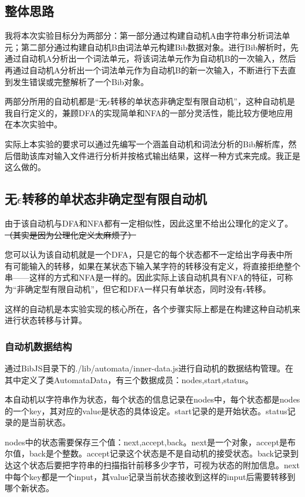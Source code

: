 \documentclass[a4paper]{article}
\begin{document}
\begin{CJK*}{UTF8}{gbsn}
    \subsection{整体思路}
    我将本次实验目标分为两部分：第一部分通过构建自动机A由字符串分析词法单元；第二部分通过构建自动机B由词法单元构建Bib数据对象。进行Bib解析时，先通过自动机A分析出一个词法单元，将该词法单元作为自动机B的一次输入，然后再通过自动机A分析出一个词法单元作为自动机B的新一次输入，不断进行下去直到发生错误或完整解析了一个Bib对象。
    \par 两部分所用的自动机都是“无$\epsilon$转移的单状态非确定型有限自动机”，这种自动机是我自行定义的，兼顾DFA的实现简单和NFA的一部分灵活性，能比较方便地应用在本次实验中。
    \par 实际上本实验的要求可以通过先编写一个涵盖自动机和词法分析的Bib解析库，然后借助该库对输入文件进行分析并按格式输出结果，这样一种方式来完成。我正是这么做的。

    \subsection{无$\epsilon$转移的单状态非确定型有限自动机}
    由于该自动机与DFA和NFA都有一定相似性，因此这里不给出公理化的定义了。\\\sout{（其实是因为公理化定义太麻烦了）}
    \par 您可以认为该自动机就是一个DFA，只是它的每个状态都不一定给出字母表中所有可能输入的转移，如果在某状态下输入某字符的转移没有定义，将直接拒绝整个串——这样的方式和NFA是一样的。因此实际上该自动机具有NFA的特征，可称为“非确定型有限自动机”，但它和DFA一样只有单状态，同时没有$\epsilon$转移。
    \par 这样的自动机是本实验实现的核心所在，各个步骤实际上都是在构建这种自动机来进行状态转移与计算。
    \subsubsection{自动机数据结构}
    通过BibJS目录下的./lib/automata/inner-data.js进行自动机的数据结构管理。在其中定义了类AutomataData，有三个数据成员：nodes,start,status。
    \par 本自动机以字符串作为状态，每个状态的信息记录在nodes中，每个状态都是nodes的一个key，其对应的value是状态的具体设定。start记录的是开始状态。status记录的是当前状态。
    \par nodes中的状态需要保存三个值：next,accept,back。next是一个对象，accept是布尔值，back是个整数。accept记录这个状态是不是自动机的接受状态。back记录到达这个状态后要把字符串的扫描指针前移多少字节，可视为状态的附加信息。next中每个key都是一个input，其value记录当前状态接收到这样的input后需要转移到哪个新状态。


\end{CJK*}
\end{document}

